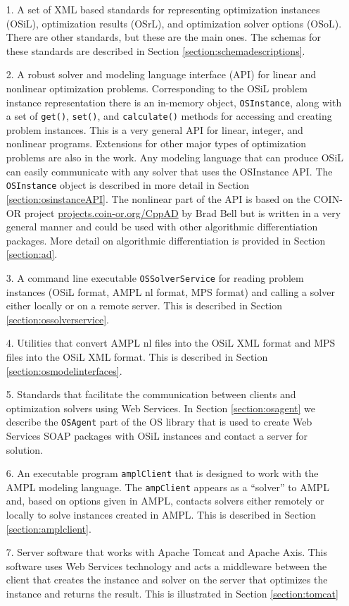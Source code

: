 \documentclass[11pt]{article}
\renewcommand{\_}{{\char"5F}}
\renewcommand{\{}{{\char"7B}}
\renewcommand{\}}{{\char"7D}}
\renewcommand{\^}{{\char"0D}}
\renewcommand{\'}{{\char"0D}}
\begin{document}
\begin{itemize}
\item[1.]  A set of XML based standards for representing optimization instances (OSiL), optimization results (OSrL), and optimization solver options (OSoL). There are other standards, but these are the main ones. The schemas for these standards are described in Section   \ref{section:schemadescriptions}.

\item[2.]  A robust solver and modeling language interface (API) for linear and nonlinear optimization problems.  Corresponding to the OSiL problem instance representation there is an in-memory object,  {\tt OSInstance}, along with a set of  {\tt get()},   {\tt set()}, and {\tt calculate()} methods for accessing and creating problem instances.
This is a very general API for linear, integer, and nonlinear programs. Extensions for other major types of optimization problems are also in the work. Any modeling language that can produce OSiL can easily communicate with any solver that uses the OSInstance API.   The {\tt OSInstance} object is described in more detail in Section \ref{section:osinstanceAPI}. The nonlinear part of the API is based on the COIN-OR project \url{projects.coin-or.org/CppAD} by Brad Bell but is written in a very general manner and could be used with other algorithmic differentiation packages. More detail on algorithmic differentiation is provided in Section \ref{section:ad}.


\item[3.]  A  command line executable {\tt OSSolverService}  for reading problem instances (OSiL format, AMPL  nl format,  MPS format) and calling a solver either locally or on a remote server.  This is described in Section \ref{section:ossolverservice}.


\item[4.] Utilities that convert AMPL nl files into the OSiL XML format and MPS files into the OSiL XML format.  This is described in Section \ref{section:osmodelinterfaces}.


\item[5.]  Standards that facilitate the communication between clients and optimization solvers using Web Services.  In  Section \ref{section:osagent} we describe the {\tt OSAgent} part of the OS library that is used to create Web Services
 SOAP packages with OSiL instances and contact a server for solution.

\item[6.]  An executable program {\tt amplClient} that is designed to work with the AMPL modeling language. The {\tt ampClient} appears as a ``solver'' to AMPL and, based on options given in AMPL, contacts solvers either remotely or locally to solve instances created in AMPL. This is described in Section \ref{section:amplclient}.

\item[7.]  Server software that works with Apache Tomcat and Apache Axis.
This software uses Web Services technology and acts a middleware between the client that creates the instance and solver on the server that optimizes the instance and returns the result. This is illustrated in Section  \ref{section:tomcat}
\end{itemize}
\end{document}
